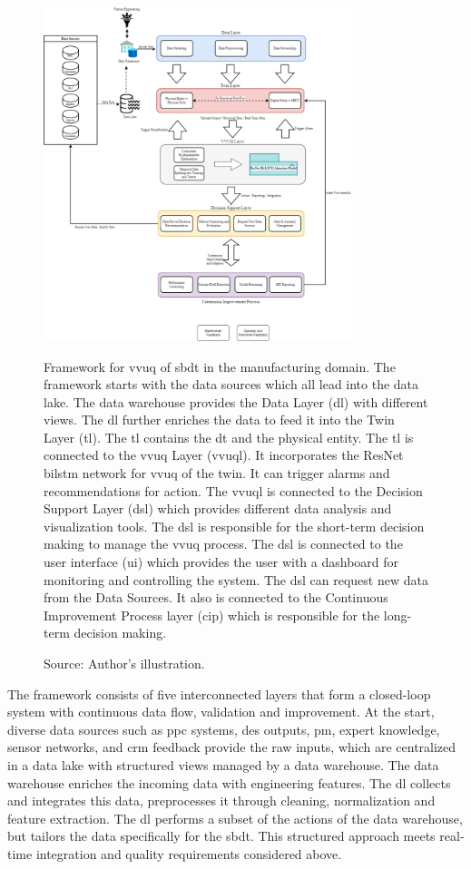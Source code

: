 \begin{figure}[htbp]
    \centering
    \includegraphics[width=0.8\textwidth]{figures/framework.png}
    \caption[The thesis VVUQ framework]{Framework for \gls{vvuq} of \gls{sbdt} in the manufacturing domain. The framework starts with the data sources which all lead into the data lake. The data warehouse provides the Data Layer (\gls{dl}) with different views. The \gls{dl} further enriches the data to feed it into the Twin Layer (\gls{tl}). The \gls{tl} contains the \gls{dt} and the physical entity. The \gls{tl} is connected to the \gls{vvuq} Layer (\gls{vvuql}). It incorporates the ResNet \gls{bilstm} network for \gls{vvuq} of the twin. It can trigger alarms and recommendations for action. The \gls{vvuql} is connected to the Decision Support Layer (\gls{dsl}) which provides different data analysis and visualization tools. The \gls{dsl} is responsible for the short-term decision making to manage the \gls{vvuq} process. The \gls{dsl} is connected to the user interface (\gls{ui}) which provides the user with a dashboard for monitoring and controlling the system. The \gls{dsl} can request new data from the Data Sources. It also is connected to the Continuous Improvement Process layer (\gls{cip}) which is responsible for the long-term decision making.}
    \caption*{Source: Author's illustration.}
    \label{fig:framework}
\end{figure}

The framework consists of five interconnected layers that form a closed-loop system with continuous data flow, validation and improvement. At the start, diverse data sources such as \gls{ppc} systems, \gls{des} outputs, \gls{pm}, expert knowledge, sensor networks, and \gls{crm} feedback provide the raw inputs, which are centralized in a data lake with structured views managed by a data warehouse. The data warehouse enriches the incoming data with engineering features. The \gls{dl} collects and integrates this data, preprocesses it through cleaning, normalization and feature extraction. The \gls{dl} performs a subset of the actions of the data warehouse, but tailors the data specifically for the \gls{sbdt}. This structured approach meets real-time integration and quality requirements considered above.

